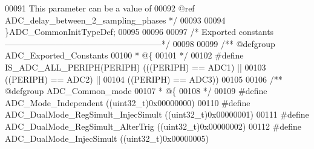 \begin{DoxyCode}
00091 \textcolor{comment}{                                               This parameter can be a value of }
00092 \textcolor{comment}{                                               @ref ADC\_delay\_between\_2\_sampling\_phases */}
00093 
00094 \}ADC\_CommonInitTypeDef;
00095 
00096 
00097 \textcolor{comment}{/* Exported constants --------------------------------------------------------*/}
00098 
00099 \textcolor{comment}{/** @defgroup ADC\_Exported\_Constants}
00100 \textcolor{comment}{  * @\{}
00101 \textcolor{comment}{  */}
00102 \textcolor{preprocessor}{#}\textcolor{preprocessor}{define} \textcolor{preprocessor}{IS\_ADC\_ALL\_PERIPH}\textcolor{preprocessor}{(}\textcolor{preprocessor}{PERIPH}\textcolor{preprocessor}{)} \textcolor{preprocessor}{(}\textcolor{preprocessor}{(}\textcolor{preprocessor}{(}\textcolor{preprocessor}{PERIPH}\textcolor{preprocessor}{)} \textcolor{preprocessor}{==} ADC1\textcolor{preprocessor}{)} \textcolor{preprocessor}{||}
00103                                    \textcolor{preprocessor}{(}\textcolor{preprocessor}{(}\textcolor{preprocessor}{PERIPH}\textcolor{preprocessor}{)} \textcolor{preprocessor}{==} ADC2\textcolor{preprocessor}{)} \textcolor{preprocessor}{||}
00104                                    \textcolor{preprocessor}{(}\textcolor{preprocessor}{(}\textcolor{preprocessor}{PERIPH}\textcolor{preprocessor}{)} \textcolor{preprocessor}{==} ADC3\textcolor{preprocessor}{)}\textcolor{preprocessor}{)}
00105 
00106 \textcolor{comment}{/** @defgroup ADC\_Common\_mode }
00107 \textcolor{comment}{  * @\{}
00108 \textcolor{comment}{  */}
00109 \textcolor{preprocessor}{#}\textcolor{preprocessor}{define} \textcolor{preprocessor}{ADC\_Mode\_Independent}                       \textcolor{preprocessor}{(}\textcolor{preprocessor}{(}\textcolor{preprocessor}{uint32\_t}\textcolor{preprocessor}{)}0x00000000\textcolor{preprocessor}{)}
00110 \textcolor{preprocessor}{#}\textcolor{preprocessor}{define} \textcolor{preprocessor}{ADC\_DualMode\_RegSimult\_InjecSimult}         \textcolor{preprocessor}{(}\textcolor{preprocessor}{(}\textcolor{preprocessor}{uint32\_t}\textcolor{preprocessor}{)}0x00000001\textcolor{preprocessor}{)}
00111 \textcolor{preprocessor}{#}\textcolor{preprocessor}{define} \textcolor{preprocessor}{ADC\_DualMode\_RegSimult\_AlterTrig}           \textcolor{preprocessor}{(}\textcolor{preprocessor}{(}\textcolor{preprocessor}{uint32\_t}\textcolor{preprocessor}{)}0x00000002\textcolor{preprocessor}{)}
00112 \textcolor{preprocessor}{#}\textcolor{preprocessor}{define} \textcolor{preprocessor}{ADC\_DualMode\_InjecSimult}                   \textcolor{preprocessor}{(}\textcolor{preprocessor}{(}\textcolor{preprocessor}{uint32\_t}\textcolor{preprocessor}{)}0x00000005\textcolor{preprocessor}{)}

\end{DoxyCode}
